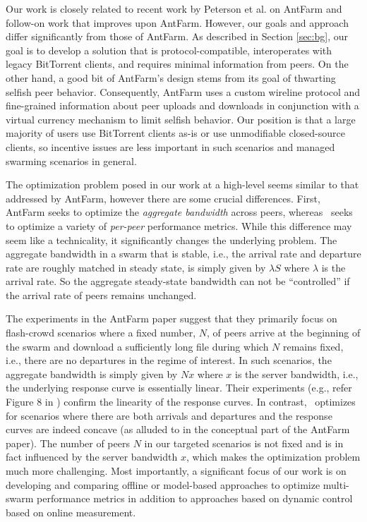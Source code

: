 {Our work is closely related to recent work by Peterson et al. on AntFarm \cite{antfarm} and follow-on work \cite{vformation} that improves upon AntFarm. However, our goals and approach differ significantly from those of AntFarm. As described in Section \ref{sec:bg}, our goal is to develop a solution that is protocol-compatible, interoperates with legacy BitTorrent clients, and requires minimal information from peers. On the other hand, a good bit of AntFarm's design stems from its goal of thwarting selfish peer behavior. Consequently, AntFarm uses a custom wireline protocol and fine-grained information about peer uploads and downloads in conjunction with a virtual currency mechanism to limit selfish behavior. Our position is that a large majority of users use BitTorrent clients as-is or use unmodifiable closed-source clients, so incentive issues are less important in such scenarios and managed swarming scenarios in general.

The optimization problem posed in our work at a high-level seems similar to that addressed by AntFarm, however there are some crucial differences. First, AntFarm seeks to optimize the {\em aggregate bandwidth} across peers, whereas \cs\ seeks to optimize a variety of {\em per-peer} performance metrics. While this difference may seem like a technicality, it significantly changes the underlying problem. The aggregate bandwidth in a swarm that is stable, i.e., the arrival rate and departure rate are roughly matched in steady state, is simply given by $\lambda S$ where $\lambda$ is the arrival rate. So the aggregate steady-state bandwidth can not be ``controlled'' if the arrival rate of peers remains unchanged. 

The experiments in the AntFarm paper suggest that they primarily focus on flash-crowd scenarios where a fixed number, $N$, of peers arrive at the beginning of the swarm and download a sufficiently long file during which $N$ remains fixed, i.e., there are no departures in the regime of interest. In such scenarios, the aggregate bandwidth is simply given by $N x$ where $x$ is the server bandwidth, i.e., the underlying response curve is essentially linear. Their experiments (e.g., refer Figure 8 in \cite{antfarm}) confirm the linearity of the response curves.  In contrast, \cs\ optimizes for scenarios where there are both arrivals and departures and the response curves are indeed concave (as alluded to in the conceptual part of the AntFarm paper). The number of peers $N$ in our targeted scenarios is not fixed and is in fact influenced by the server bandwidth $x$, which makes the optimization problem much more challenging.  Most importantly, a significant focus of our work is on developing and  comparing offline or model-based approaches to optimize multi-swarm performance metrics in addition to approaches based on dynamic control based on online measurement.



}
